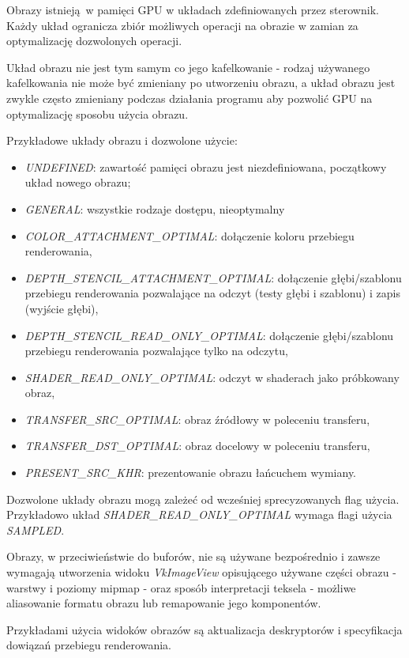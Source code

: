 Obrazy istnieją w pamięci GPU w układach zdefiniowanych przez sterownik.
Każdy układ ogranicza zbiór możliwych operacji na obrazie w zamian za optymalizację dozwolonych operacji.

Układ obrazu nie jest tym samym co jego kafelkowanie - rodzaj używanego kafelkowania nie może być zmieniany po utworzeniu obrazu, a układ obrazu jest zwykle często zmieniany podczas działania programu aby pozwolić GPU na optymalizację sposobu użycia obrazu.

Przykładowe układy obrazu i dozwolone użycie:
\begin{itemize}
	\item \textit{UNDEFINED}: zawartość pamięci obrazu jest niezdefiniowana, początkowy układ nowego obrazu;
	\item \textit{GENERAL}: wszystkie rodzaje dostępu, nieoptymalny
	\item \textit{COLOR\_ATTACHMENT\_OPTIMAL}: dołączenie koloru przebiegu renderowania,
	\item \textit{DEPTH\_STENCIL\_ATTACHMENT\_OPTIMAL}: dołączenie głębi/szablonu przebiegu renderowania pozwalające na odczyt (testy głębi i szablonu) i zapis (wyjście głębi),
	\item \textit{DEPTH\_STENCIL\_READ\_ONLY\_OPTIMAL}: dołączenie głębi/szablonu przebiegu renderowania pozwalające tylko na odczytu,
	\item \textit{SHADER\_READ\_ONLY\_OPTIMAL}: odczyt w shaderach jako próbkowany obraz,
	\item \textit{TRANSFER\_SRC\_OPTIMAL}: obraz źródłowy w poleceniu transferu,
	\item \textit{TRANSFER\_DST\_OPTIMAL}: obraz docelowy w poleceniu transferu,
	\item \textit{PRESENT\_SRC\_KHR}: prezentowanie obrazu łańcuchem wymiany.
\end{itemize}
Dozwolone układy obrazu mogą zależeć od wcześniej sprecyzowanych flag użycia. Przykładowo układ \textit{SHADER\_READ\_ONLY\_OPTIMAL} wymaga flagi użycia \textit{SAMPLED}.

Obrazy, w przeciwieństwie do buforów, nie są używane bezpośrednio i zawsze wymagają utworzenia widoku \textit{VkImageView} opisującego używane części obrazu - warstwy i poziomy mipmap - oraz sposób interpretacji teksela - możliwe aliasowanie formatu obrazu lub remapowanie jego komponentów.

Przykładami użycia widoków obrazów są aktualizacja deskryptorów i specyfikacja dowiązań przebiegu renderowania.

